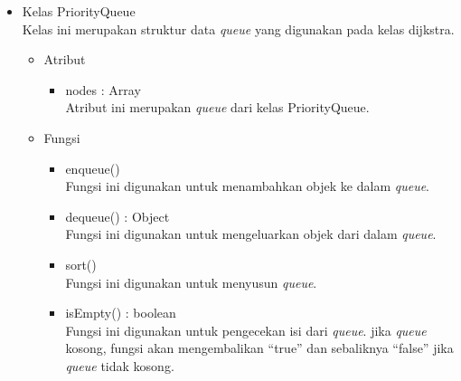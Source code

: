 \begin{itemize}
  \item Kelas PriorityQueue\\
  Kelas ini merupakan struktur data \textit{queue} yang digunakan pada
  kelas dijkstra.
  \begin{itemize}
    \item Atribut
    \begin{itemize}
      \item nodes : Array\\
      Atribut ini merupakan \textit{queue} dari kelas PriorityQueue.
    \end{itemize}
  \end{itemize}
  \begin{itemize}
    \item Fungsi
    \begin{itemize}
      \item enqueue()\\
      Fungsi ini digunakan untuk menambahkan objek ke dalam \textit{queue}.
      
      \item dequeue() : Object\\
      Fungsi ini digunakan untuk mengeluarkan objek dari dalam \textit{queue}.
      
      \item sort()\\
      Fungsi ini digunakan untuk menyusun \textit{queue}.
      
      \item isEmpty() : boolean\\
      Fungsi ini digunakan untuk pengecekan isi dari \textit{queue}. jika
      \textit{queue} kosong, fungsi akan mengembalikan ``true'' dan sebaliknya
      ``false'' jika \textit{queue} tidak kosong.
    \end{itemize}
  \end{itemize}
\end{itemize}

